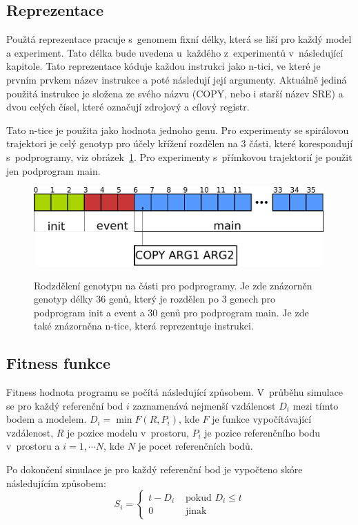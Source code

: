 \subsection{Reprezentace}
Použtá reprezentace pracuje s~genomem fixní délky, která se liší pro každý model a experiment.
Tato délka bude uvedena u~každého z~experimentů v~následující kapitole.
Tato reprezentace kóduje každou instrukci jako n-tici, ve které je prvním prvkem název instrukce a poté následují její argumenty.
Aktuálně jediná použitá instrukce je složena ze svého názvu (COPY, nebo i starší název SRE) a dvou celých čísel, které označují zdrojový a cílový registr.

Tato n-tice je použita jako hodnota jednoho genu.
Pro experimenty se spirálovou trajektori je celý genotyp pro účely křížení rozdělen na 3 části, které korespondují s~podprogramy, viz obrázek~\ref{fig:genotyp}.
Pro experimenty s~přímkovou trajektorií je použit jen podprogram main.

\begin{figure}[h]
    \centering
    {\includegraphics[width=30em]{obrazky/genotyp.pdf}}
    \caption[Rodzdělení genotypu na části pro podprogramy]{
    Rodzdělení genotypu na části pro podprogramy.
    Je zde znázorněn genotyp délky 36 genů, který je rozdělen po 3 genech pro podprogram init a event a 30 genů pro podprogram main.
    Je zde také znázorněna n-tice, která reprezentuje instrukci.
    }
    \label{fig:genotyp}
\end{figure}


\subsection{Fitness funkce}
Fitness hodnota programu se počítá následující způsobem.
V~průběhu simulace se pro každý referenční bod $i$ zaznamenává nejmenší vzdálenost $D_i$ mezi tímto bodem a modelem.
$D_i = \min{F(R, P_i)}$, kde $F$ je funkce vypočítávající vzdálenost, $R$ je pozice modelu v~prostoru, $P_i$ je pozice referenčního bodu v~prostoru a $i=1, \cdots N$, kde $N$ je pocet referenčních bodů.

Po dokončení simulace je pro každý referenční bod je vypočteno skóre následujícím způsobem:
$$S_i=\left\{\begin{matrix}
                 t - D_i&\mbox{ pokud }D_{i}\leq t\\ 0 &\mbox{ jinak }
\end{matrix}\right.$$

